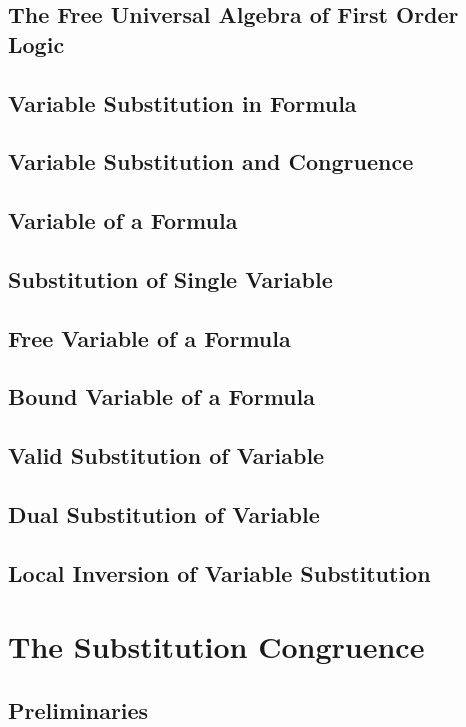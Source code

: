 \documentclass{report}
\begin{document}
    \subsection{The Free Universal Algebra of First Order Logic}
      
    \subsection{Variable Substitution in Formula}
      
    \subsection{Variable Substitution and Congruence}
      
    \subsection{Variable of a Formula}
      
    \subsection{Substitution of Single Variable}
      
    \subsection{Free Variable of a Formula}
      
    \subsection{Bound Variable of a Formula}
      
    \subsection{Valid Substitution of Variable}
      
    \subsection{Dual Substitution of Variable}
      
    \subsection{Local Inversion of Variable Substitution}
      
\section{The Substitution Congruence}
    \subsection{Preliminaries}
      
\end{document}
